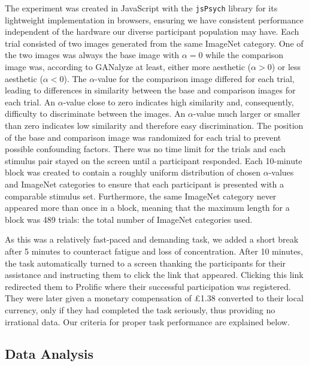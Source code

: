 \documentclass[../main.tex]{subfiles}
\begin{document}
The experiment was created in JavaScript with the \texttt{jsPsych} library \parencite{de2015jspsych} for its lightweight implementation in browsers, ensuring we have consistent performance independent of the hardware our diverse participant population may have. Each trial consisted of two images generated from the same ImageNet category. One of the two images was always the base image with $\alpha = 0$ while the comparison image was, according to GANalyze at least, either more aesthetic ($\alpha > 0$) or less aesthetic ($\alpha < 0$). The $\alpha$-value for the comparison image differed for each trial, leading to differences in similarity between the base and comparison images for each trial. An $\alpha$-value close to zero indicates high similarity and, consequently, difficulty to discriminate between the images. An $\alpha$-value much larger or smaller than zero indicates low similarity and therefore easy discrimination. The position of the base and comparison image was randomized for each trial to prevent possible confounding factors. There was no time limit for the trials and each stimulus pair stayed on the screen until a participant responded. Each 10-minute block was created to contain a roughly uniform distribution of chosen $\alpha$-values and ImageNet categories to ensure that each participant is presented with a comparable stimulus set. Furthermore, the same ImageNet category never appeared more than once in a block, meaning that the maximum length for a block was 489 trials: the total number of ImageNet categories used.

As this was a relatively fast-paced and demanding task, we added a short break after 5 minutes to counteract fatigue and loss of concentration. After 10 minutes, the task automatically turned to a screen thanking the participants for their assistance and instructing them to click the link that appeared. Clicking this link redirected them to Prolific where their successful participation was registered. They were later given a monetary compensation of £1.38 converted to their local currency, only if they had completed the task seriously, thus providing no irrational data. Our criteria for proper task performance are explained below.



\subsection{Data Analysis}
\end{document}
